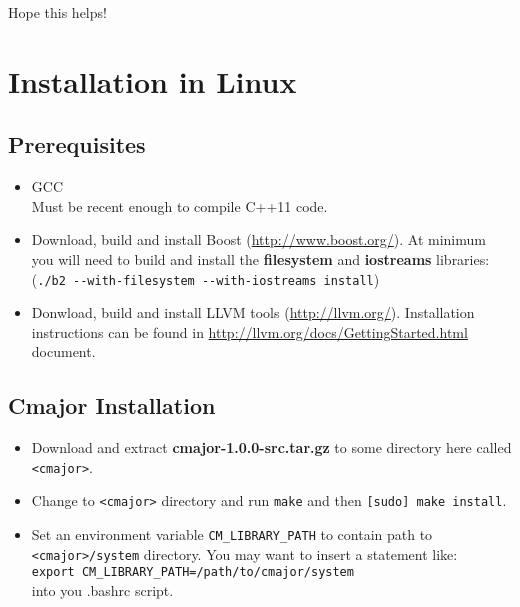 \documentclass[oneside, a4paper, 11pt]{article}
\begin{document}
Hope this helps!

\section{Installation in Linux}

\subsection{Prerequisites}

\begin{itemize}

\item
GCC\\
Must be recent enough to compile C++11 code.

\item
Download, build and install Boost (\url{http://www.boost.org/}).
At minimum you will need to build and install the
\textbf{filesystem} and \textbf{iostreams} libraries:\\
(\verb|./b2 --with-filesystem --with-iostreams install|)

\item
Donwload, build and install LLVM tools (\url{http://llvm.org/}).
Installation instructions can be found in \url{http://llvm.org/docs/GettingStarted.html} document.

\end{itemize}

\subsection{Cmajor Installation}

\begin{itemize}

\item
Download and extract \textbf{cmajor-1.0.0-src.tar.gz} to some directory here called \verb|<cmajor>|.

\item
Change to \verb|<cmajor>| directory and run \verb|make| and then \verb|[sudo] make install|.

\item
Set an environment variable \verb|CM_LIBRARY_PATH| to contain path to \verb|<cmajor>/system| directory.
You may want to insert a statement like:\\
\verb|export CM_LIBRARY_PATH=/path/to/cmajor/system|\\
into you .bashrc script.

\end{itemize}
\end{document}
